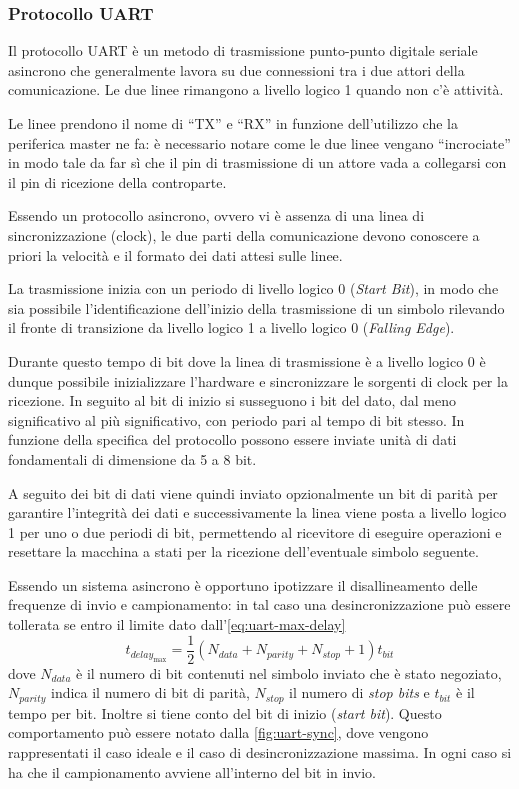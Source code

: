 \subsubsection{Protocollo UART}\label{ss:uart}

Il protocollo UART è un metodo di trasmissione punto-punto digitale seriale asincrono che generalmente lavora su due connessioni tra i due attori della comunicazione. Le due linee rimangono a livello logico 1 quando non c'è attività.

Le linee prendono il nome di ``TX'' e ``RX'' in funzione dell'utilizzo che la periferica master ne fa: è necessario notare come le due linee vengano ``incrociate'' in modo tale da far sì che il pin di trasmissione di un attore vada a collegarsi con il pin di ricezione della controparte.

Essendo un protocollo asincrono, ovvero vi è assenza di una linea di sincronizzazione (clock), le due parti della comunicazione devono conoscere a priori la velocità e il formato dei dati attesi sulle linee.

La trasmissione inizia con un periodo di livello logico 0 (\textit{Start Bit}), in modo che sia possibile l'identificazione dell'inizio della trasmissione di un simbolo rilevando il fronte di transizione da livello logico 1 a livello logico 0 (\textit{Falling Edge}).

Durante questo tempo di bit dove la linea di trasmissione è a livello logico 0 è dunque possibile inizializzare l'hardware e sincronizzare le sorgenti di clock per la ricezione. In seguito al bit di inizio si susseguono i bit del dato, dal meno significativo al più significativo, con periodo pari al tempo di bit stesso. In funzione della specifica del protocollo possono essere inviate unità di dati fondamentali di dimensione da 5 a 8 bit.

A seguito dei bit di dati viene quindi inviato opzionalmente un bit di parità per garantire l'integrità dei dati e successivamente la linea viene posta a livello logico 1 per uno o due periodi di bit, permettendo al ricevitore di eseguire operazioni e resettare la macchina a stati per la ricezione dell'eventuale simbolo seguente.\cite{site:rs-uart}

Essendo un sistema asincrono è opportuno ipotizzare il disallineamento delle frequenze di invio e campionamento: in tal caso una desincronizzazione può essere tollerata se entro il limite dato dall'\cref{eq:uart-max-delay}
\begin{equation}\label{eq:uart-max-delay}
    t_{delay_{\max}} = \frac{1}{2}(N_{data}+N_{parity}+N_{stop}+1)t_{bit}    
\end{equation}
dove \(N_{data}\) è il numero di bit contenuti nel simbolo inviato che è stato negoziato, \(N_{parity}\) indica il numero di bit di parità, \(N_{stop}\) il numero di \textit{stop bits} e \(t_{bit}\) è il tempo per bit. Inoltre si tiene conto del bit di inizio (\textit{start bit}). Questo comportamento può essere notato dalla \cref{fig:uart-sync}, dove vengono rappresentati il caso ideale e il caso di desincronizzazione massima. In ogni caso si ha che il campionamento avviene all'interno del bit in invio.

